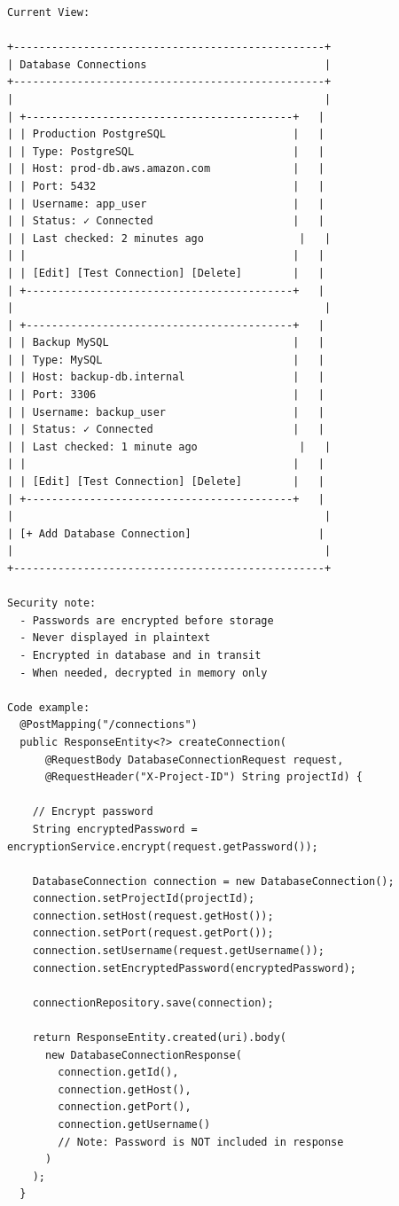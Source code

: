 \documentclass[11pt,a4paper]{report}
\begin{document}
\begin{lstlisting}[language=text]
Current View:

+-------------------------------------------------+
| Database Connections                            |
+-------------------------------------------------+
|                                                 |
| +------------------------------------------+   |
| | Production PostgreSQL                    |   |
| | Type: PostgreSQL                         |   |
| | Host: prod-db.aws.amazon.com             |   |
| | Port: 5432                               |   |
| | Username: app_user                       |   |
| | Status: ✓ Connected                      |   |
| | Last checked: 2 minutes ago               |   |
| |                                          |   |
| | [Edit] [Test Connection] [Delete]        |   |
| +------------------------------------------+   |
|                                                 |
| +------------------------------------------+   |
| | Backup MySQL                             |   |
| | Type: MySQL                              |   |
| | Host: backup-db.internal                 |   |
| | Port: 3306                               |   |
| | Username: backup_user                    |   |
| | Status: ✓ Connected                      |   |
| | Last checked: 1 minute ago                |   |
| |                                          |   |
| | [Edit] [Test Connection] [Delete]        |   |
| +------------------------------------------+   |
|                                                 |
| [+ Add Database Connection]                    |
|                                                 |
+-------------------------------------------------+

Security note:
  - Passwords are encrypted before storage
  - Never displayed in plaintext
  - Encrypted in database and in transit
  - When needed, decrypted in memory only
  
Code example:
  @PostMapping("/connections")
  public ResponseEntity<?> createConnection(
      @RequestBody DatabaseConnectionRequest request,
      @RequestHeader("X-Project-ID") String projectId) {
    
    // Encrypt password
    String encryptedPassword = encryptionService.encrypt(request.getPassword());
    
    DatabaseConnection connection = new DatabaseConnection();
    connection.setProjectId(projectId);
    connection.setHost(request.getHost());
    connection.setPort(request.getPort());
    connection.setUsername(request.getUsername());
    connection.setEncryptedPassword(encryptedPassword);
    
    connectionRepository.save(connection);
    
    return ResponseEntity.created(uri).body(
      new DatabaseConnectionResponse(
        connection.getId(),
        connection.getHost(),
        connection.getPort(),
        connection.getUsername()
        // Note: Password is NOT included in response
      )
    );
  }
\end{lstlisting}
\end{document}
